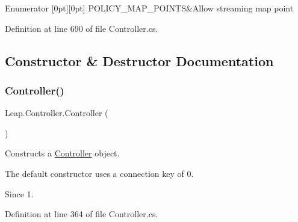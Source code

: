 \begin{DoxyEnumFields}{Enumerator}
[0pt][0pt]{}\mbox{\label{class_leap_1_1_controller_a0bdb49fa94aa2da8b098c1ac296528d6a913295f4bfba846c1ee80037a8a2b7be}} 
P\+O\+L\+I\+C\+Y\+\_\+\+M\+A\+P\+\_\+\+P\+O\+I\+N\+TS&Allow streaming map point \\
\hline

\end{DoxyEnumFields}


Definition at line 690 of file Controller.\+cs.



\subsection{Constructor \& Destructor Documentation}
\mbox{\label{class_leap_1_1_controller_a55b80a043ff15459a08b60bf9f85a955}} 
\subsubsection{\texorpdfstring{Controller()}{Controller()}\hspace{0.1cm}{\footnotesize\ttfamily [1/2]}}
{\footnotesize\ttfamily Leap.\+Controller.\+Controller (\begin{DoxyParamCaption}{ }\end{DoxyParamCaption})}



Constructs a \mbox{\hyperlink{class_leap_1_1_controller}{Controller}} object. 

The default constructor uses a connection key of 0.

\begin{DoxySince}{Since}
1. 
\end{DoxySince}


Definition at line 364 of file Controller.\+cs.

\mbox{\label{class_leap_1_1_controller_aa96fa3ac415fe7564a7a9578041d5fff}} 
